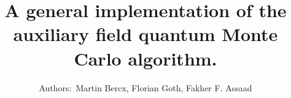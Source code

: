 \documentclass[10pt,Arial]{article}
\begin{document}
\title{A general  implementation of the auxiliary field quantum Monte Carlo  algorithm.}
\author{Authors:~Martin Bercx,  Florian Goth,  Fakher F. Assaad }
\maketitle
\tableofcontents
\clearpage







%
%
%

%
%
%
%
\end{document}
